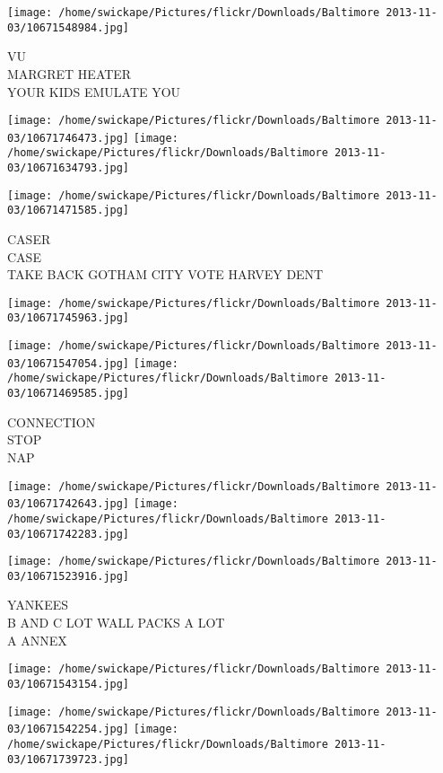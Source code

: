 \documentclass[10pt,letterpaper]{article}
\begin{document}
\vspace{0.25in}
\texttt{[image: /home/swickape/Pictures/flickr/Downloads/Baltimore 2013-11-03/10671548984.jpg]}

VU\\
MARGRET HEATER\\
YOUR KIDS EMULATE YOU
\pagebreak

\texttt{[image: /home/swickape/Pictures/flickr/Downloads/Baltimore 2013-11-03/10671746473.jpg]}
\texttt{[image: /home/swickape/Pictures/flickr/Downloads/Baltimore 2013-11-03/10671634793.jpg]}

\texttt{[image: /home/swickape/Pictures/flickr/Downloads/Baltimore 2013-11-03/10671471585.jpg]}

CASER\\
CASE\\
TAKE BACK GOTHAM CITY VOTE HARVEY DENT
\pagebreak

\texttt{[image: /home/swickape/Pictures/flickr/Downloads/Baltimore 2013-11-03/10671745963.jpg]}

\vspace{0.25in}
\texttt{[image: /home/swickape/Pictures/flickr/Downloads/Baltimore 2013-11-03/10671547054.jpg]}
\texttt{[image: /home/swickape/Pictures/flickr/Downloads/Baltimore 2013-11-03/10671469585.jpg]}

CONNECTION\\
STOP\\
NAP
\pagebreak

\texttt{[image: /home/swickape/Pictures/flickr/Downloads/Baltimore 2013-11-03/10671742643.jpg]}
\texttt{[image: /home/swickape/Pictures/flickr/Downloads/Baltimore 2013-11-03/10671742283.jpg]}

\texttt{[image: /home/swickape/Pictures/flickr/Downloads/Baltimore 2013-11-03/10671523916.jpg]}

YANKEES\\
B AND C LOT WALL PACKS A LOT\\
A ANNEX
\pagebreak

\texttt{[image: /home/swickape/Pictures/flickr/Downloads/Baltimore 2013-11-03/10671543154.jpg]}

\vspace{0.25in}
\texttt{[image: /home/swickape/Pictures/flickr/Downloads/Baltimore 2013-11-03/10671542254.jpg]}
\texttt{[image: /home/swickape/Pictures/flickr/Downloads/Baltimore 2013-11-03/10671739723.jpg]}
\end{document}
